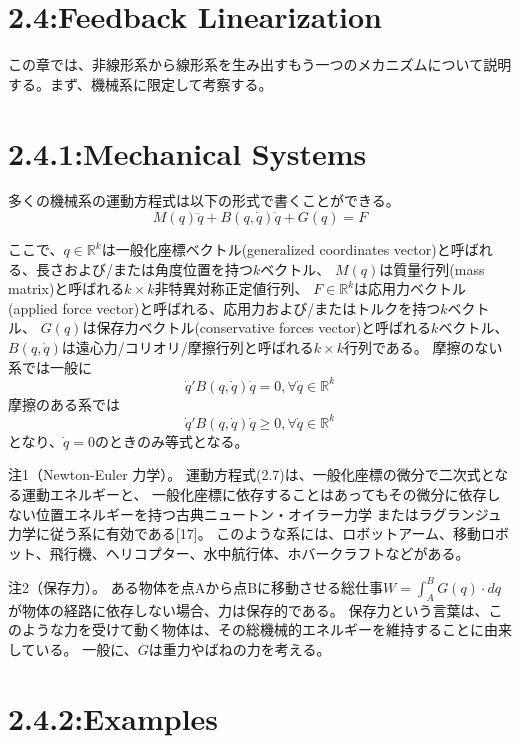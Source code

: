 \documentclass{jsarticle}
\begin{document}


\section*{2.4:Feedback Linearization}
この章では、非線形系から線形系を生み出すもう一つのメカニズムについて説明する。まず、機械系に限定して考察する。

\section*{2.4.1:Mechanical Systems}
多くの機械系の運動方程式は以下の形式で書くことができる。
\begin{equation}
  M(q)\ddot{q}+B(q,\dot{q})\dot{q}+G(q)=F  \tag{2.7}
\end{equation}

ここで、$q\in \mathbb{R}^k$は一般化座標ベクトル(generalized coordinates vector)と呼ばれる、長さおよび/または角度位置を持つ$k$ベクトル、
$M(q)$は質量行列(mass matrix)と呼ばれる$k\times k$非特異対称正定値行列、
$F\in \mathbb{R}^k$は応用力ベクトル(applied force vector)と呼ばれる、応用力および/またはトルクを持つ$k$ベクトル、
$G(q)$は保存力ベクトル(conservative forces vector)と呼ばれる$k$ベクトル、
$B(q,\dot{q})$は遠心力/コリオリ/摩擦行列と呼ばれる$k\times k$行列である。
摩擦のない系では一般に
\begin{equation}
  \dot{q}'B(q,\dot{q})\dot{q} = 0, \forall \dot{q}\in \mathbb{R}^k
\end{equation}
摩擦のある系では
\begin{equation}
  \dot{q}'B(q,\dot{q})\dot{q} \geq 0, \forall \dot{q}\in \mathbb{R}^k
\end{equation}
となり、$\dot{q} = 0$のときのみ等式となる。

注1（Newton-Euler 力学）。
運動方程式(2.7)は、一般化座標の微分で二次式となる運動エネルギーと、
一般化座標に依存することはあってもその微分に依存しない位置エネルギーを持つ古典ニュートン・オイラー力学
またはラグランジュ力学に従う系に有効である[17]。
このような系には、ロボットアーム、移動ロボット、飛行機、ヘリコプター、水中航行体、ホバークラフトなどがある。

注2（保存力）。
ある物体を点Aから点Bに移動させる総仕事$W= \int^B_A G(q) \cdot dq$が物体の経路に依存しない場合、力は保存的である。
保存力という言葉は、このような力を受けて動く物体は、その総機械的エネルギーを維持することに由来している。
一般に、$G$は重力やばねの力を考える。

\section*{2.4.2:Examples}
\end{document}
